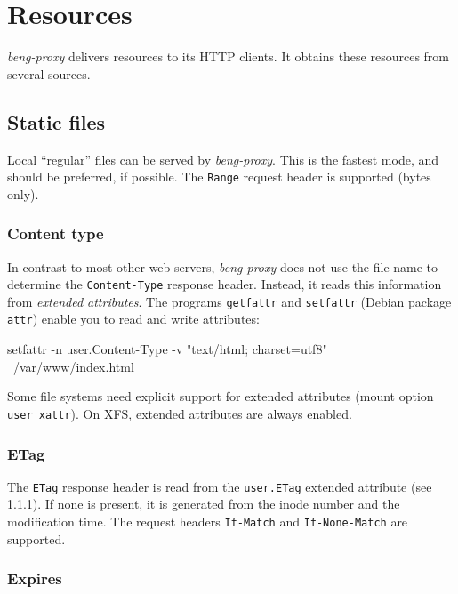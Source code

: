 \documentclass[a4paper,12pt]{article}
\begin{document}
\section{Resources}

\emph{beng-proxy} delivers resources to its HTTP clients.  It obtains
these resources from several sources.

\subsection{Static files}
\label{static}

Local ``regular'' files can be served by \emph{beng-proxy}.  This is
the fastest mode, and should be preferred, if possible.  The
\texttt{Range} request header is supported (bytes only).

\subsubsection{Content type}

\label{xattr}

In contrast to most other web servers, \emph{beng-proxy} does not use
the file name to determine the \texttt{Content-Type} response header.
Instead, it reads this information from \textit{extended attributes}.
The programs \texttt{getfattr} and \texttt{setfattr} (Debian package
\texttt{attr}) enable you to read and write attributes:

\begin{verbatim*}
setfattr -n user.Content-Type -v "text/html; charset=utf8" \
/var/www/index.html
\end{verbatim*}

Some file systems need explicit support for extended attributes (mount
option \texttt{user\_xattr}).  On
XFS, extended attributes are always enabled.

\subsubsection{ETag}

The \texttt{ETag} response header is read from the \texttt{user.ETag}
extended attribute (see \ref{xattr}).  If none is present, it is
generated from the inode number and the modification time.  The request
headers \texttt{If-Match} and \texttt{If-None-Match} are supported.

\subsubsection{Expires}
\end{document}
